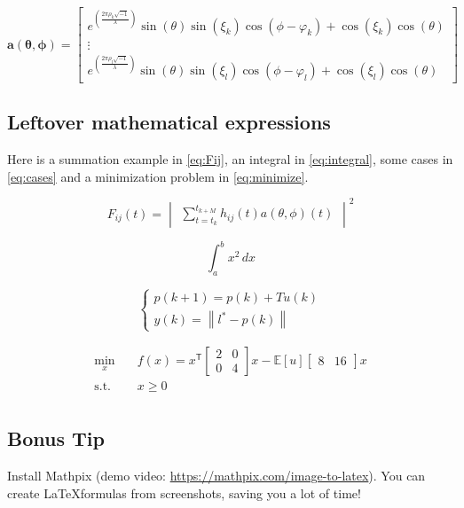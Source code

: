 \begin{equation}
    \mathbf{a(\theta, \phi)} =
    \begin{bmatrix}
        e^{( \frac{2 \pi \rho_k \sqrt{-1}}{\lambda} )} \sin(\theta) \sin(\xi_k) \cos(\phi - \varphi_k) + \cos(\xi_k) \cos(\theta) \\
        \vdots                                                                                                                    \\
        e^{( \frac{2 \pi \rho_{l} \sqrt{-1}}{\lambda} )} \sin(\theta) \sin(\xi_{l}) \cos(\phi - \varphi_{l}) + \cos(\xi_{l}) \cos(\theta)
    \end{bmatrix}
    \label{eq:matrix}
\end{equation}

\subsection{Leftover mathematical expressions}
Here is a summation example in \autoref{eq:Fij}, an integral in \autoref{eq:integral}, some cases in \autoref{eq:cases} and a minimization problem in \autoref{eq:minimize}.

\begin{equation}
    F_{ij}(t) = \begin{vmatrix} \sum\limits_{t=t_k}^{t_{k+M}} h_{ij}(t) a(\theta,\phi)(t) \end{vmatrix} ^2
    \label{eq:Fij}
\end{equation}

\begin{equation}
    \int_{a}^{b} x^2 \,dx
    \label{eq:integral}
\end{equation}

\begin{equation}
    \begin{cases}
        p(k+1) = p(k) + T u(k) \\
        y(k) = \left\|l^* - p(k) \right\|
    \end{cases}
    \label{eq:cases}
\end{equation}

\begin{equation}
    \begin{aligned}
        \min_{x} \quad      & f(x) = x^\mathsf{T}
        \begin{bmatrix}
            2 & 0 \\ 0 & 4
        \end{bmatrix}
        x - \mathbb{E}[u]
        \begin{bmatrix}
            8 & 16
        \end{bmatrix}
        x                                         \\
        \textrm{s.t.} \quad & x \geq 0            \\
    \end{aligned}
    \label{eq:minimize}
\end{equation}

\subsection{Bonus Tip}
Install Mathpix (demo video: \url{https://mathpix.com/image-to-latex}). You can create \LaTeX formulas from screenshots, saving you a lot of time!